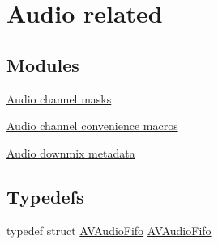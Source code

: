 \hypertarget{group__lavu__audio}{}\section{Audio related}
\label{group__lavu__audio}
\subsection*{Modules}
\begin{DoxyCompactItemize}
\item 
\hyperlink{group__channel__masks}{Audio channel masks}
\item 
\hyperlink{group__channel__mask__c}{Audio channel convenience macros}
\item 
\hyperlink{group__downmix__info}{Audio downmix metadata}
\end{DoxyCompactItemize}
\subsection*{Typedefs}
\begin{DoxyCompactItemize}
\item 
typedef struct \hyperlink{group__lavu__audio_ga328abb21e9abb2c455d2d9c212d5230f}{A\+V\+Audio\+Fifo} \hyperlink{group__lavu__audio_ga328abb21e9abb2c455d2d9c212d5230f}{A\+V\+Audio\+Fifo}
\end{DoxyCompactItemize}
